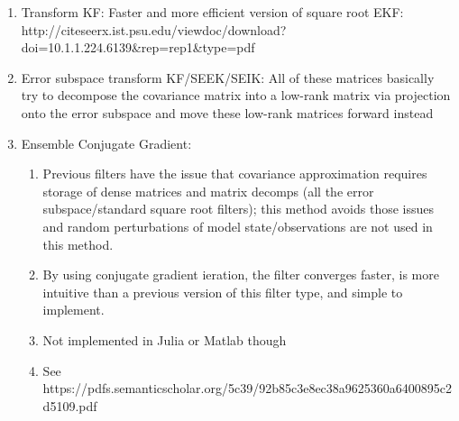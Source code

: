 \documentclass[12 pt, oneside]{article}
\theoremstyle{definition}
\theoremstyle{definition}
\theoremstyle{definition}
\begin{document}
\begin{enumerate}
\begin{enumerate}
\end{enumerate}
\item Transform KF: Faster and more efficient version of square root EKF: http://citeseerx.ist.psu.edu/viewdoc/download?doi=10.1.1.224.6139\&rep=rep1\&type=pdf
\item Error subspace transform KF/SEEK/SEIK: All of these matrices basically try to decompose the covariance matrix into a low-rank matrix via projection onto the error subspace and move these low-rank matrices forward instead
\item Ensemble Conjugate Gradient:
\begin{enumerate}
\item Previous filters have the issue that covariance approximation requires storage of dense matrices and matrix decomps (all the error subspace/standard square root filters); this method avoids those issues and random perturbations of model state/observations are not used in this method.
\item By using conjugate gradient ieration, the filter converges faster, is more intuitive than a previous version of this filter type, and simple to implement.
\item Not implemented in Julia or Matlab though
\item See https://pdfs.semanticscholar.org/5c39/92b85c3e8ec38a9625360a6400895c2d5109.pdf
\end{enumerate}
\end{enumerate}
\end{document}
